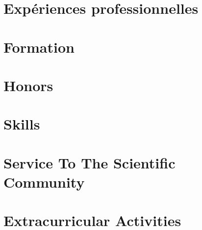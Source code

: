 \documentclass{prometheus_cv}
\begin{document}
\thispagestyle{empty}					%
\pagestyle{fancy}			 		%

\vspace*{-1cm}
\centering 


\vspace*{0.4cm}
\section{Expériences professionnelles}


\vspace*{0.4cm}
\section{Formation}


\printbibliography[title={Publications et communications}]

\section{Honors}
%

\section{Skills}
%


\section{Service To The Scientific Community}
%


\section{Extracurricular Activities}
%
\end{document}
